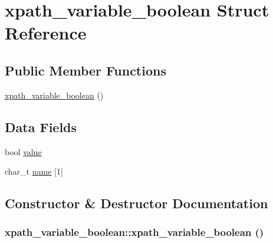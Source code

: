 \hypertarget{structxpath__variable__boolean}{
\section{xpath\_\-variable\_\-boolean Struct Reference}
\label{structxpath__variable__boolean}
}
\subsection*{Public Member Functions}
\begin{DoxyCompactItemize}
\item 
\hyperlink{structxpath__variable__boolean_a0d846c0137da3ceca54482939af4002c}{xpath\_\-variable\_\-boolean} ()
\end{DoxyCompactItemize}
\subsection*{Data Fields}
\begin{DoxyCompactItemize}
\item 
bool \hyperlink{structxpath__variable__boolean_ab54117a6cced8c3e029724651df4d404}{value}
\item 
char\_\-t \hyperlink{structxpath__variable__boolean_a2b2cb81ee5c9a19a667428d08d5bb951}{name} \mbox{[}1\mbox{]}
\end{DoxyCompactItemize}


\subsection{Constructor \& Destructor Documentation}
\hypertarget{structxpath__variable__boolean_a0d846c0137da3ceca54482939af4002c}{
\subsubsection[{xpath\_\-variable\_\-boolean}]{\setlength{\rightskip}{0pt plus 5cm}xpath\_\-variable\_\-boolean::xpath\_\-variable\_\-boolean ()}}
\label{structxpath__variable__boolean_a0d846c0137da3ceca54482939af4002c}


